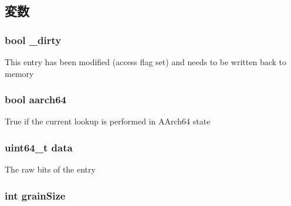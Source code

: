 \subsection{変数}
\hypertarget{classArmISA_1_1TableWalker_1_1LongDescriptor_ad9d7d92a6dc33a9bf186020af3053844}{
\subsubsection[{\_\-dirty}]{\setlength{\rightskip}{0pt plus 5cm}bool {\bf \_\-dirty}}}
\label{classArmISA_1_1TableWalker_1_1LongDescriptor_ad9d7d92a6dc33a9bf186020af3053844}
This entry has been modified (access flag set) and needs to be written back to memory \hypertarget{classArmISA_1_1TableWalker_1_1LongDescriptor_a52c06c8a54293998f3e1f71cdbd916f7}{
\subsubsection[{aarch64}]{\setlength{\rightskip}{0pt plus 5cm}bool {\bf aarch64}}}
\label{classArmISA_1_1TableWalker_1_1LongDescriptor_a52c06c8a54293998f3e1f71cdbd916f7}
True if the current lookup is performed in AArch64 state \hypertarget{classArmISA_1_1TableWalker_1_1LongDescriptor_ae421a8889820e685feae3e58e1d5fca0}{
\subsubsection[{data}]{\setlength{\rightskip}{0pt plus 5cm}uint64\_\-t {\bf data}}}
\label{classArmISA_1_1TableWalker_1_1LongDescriptor_ae421a8889820e685feae3e58e1d5fca0}
The raw bits of the entry \hypertarget{classArmISA_1_1TableWalker_1_1LongDescriptor_a887606cb7c0d8e19afb1a67ac7293519}{
\subsubsection[{grainSize}]{\setlength{\rightskip}{0pt plus 5cm}int {\bf grainSize}}}
